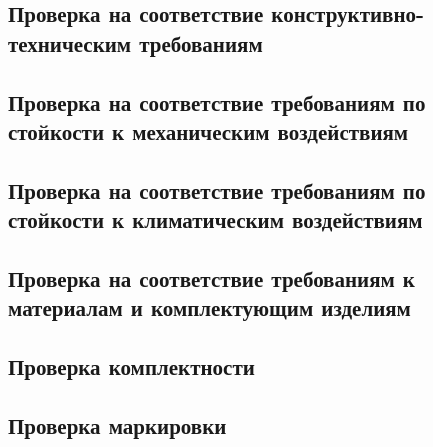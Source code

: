\documentclass[columnsxxiv,columnsxxvii,pointsubsection]{eskdtext}
\begin{document}
	\subsection{Проверка на соответствие конструктивно-техническим требованиям}
	\point
	\label{m_kt_m}
	
	\point
	\label{m_kt_pok}
	
	
	\subsection{Проверка на соответствие требованиям по стойкости к механическим воздействиям}
%	
	\point
	\label{m_m_shsv_st}
	
	\point
	\label{m_m_ydar_mng_st}
	
	\point
	\label{m_m_ydar_mng_pr}
	
%	
	\point
	\label{m_m_noise}
	
	\point
	\label{m_m_yskor}
	
	
	\subsection{Проверка на соответствие требованиям по стойкости к климатическим воздействиям}
	\point
	\label{m_k_p}
	
	\point
	\label{m_k_m}
	
	\point
	\label{m_k_vlg}
	
	\point
	\label{m_k_ckl}
	
%	
	\point
	\label{m_k_dav_t}
	
	\point
	\label{m_k_mist}
	
	\point
	\label{m_k_rosa}
	
	
	\subsection{Проверка на соответствие требованиям к материалам и комплектующим изделиям}
	\point
	\label{m_smp}
	
	
%	
	
	\subsection{Проверка комплектности}
	\point
	\label{m_komp}
	
	
	\subsection{Проверка маркировки}
	\point
	\label{m_mar_ms}
	
	\point
	\label{m_mar_mar}
	
	
\end{document}
